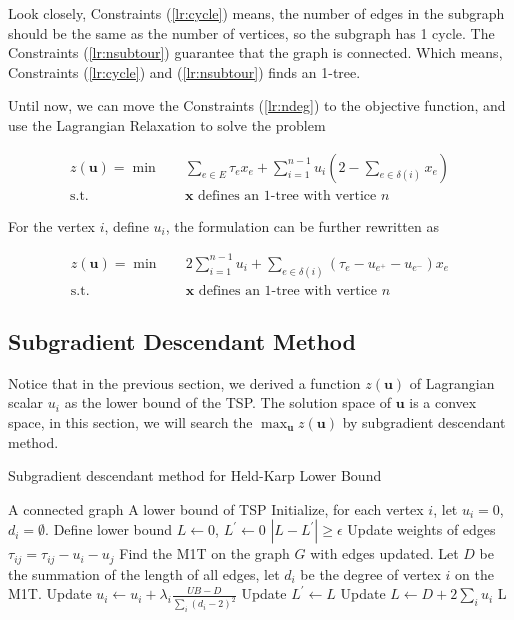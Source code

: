             Look closely, Constraints (\ref{lr:cycle}) means, the number of edges in the subgraph should be the same as the number of vertices, so the subgraph has 1 cycle. The Constraints (\ref{lr:nsubtour}) guarantee that the graph is connected. Which means, Constraints (\ref{lr:cycle}) and (\ref{lr:nsubtour}) finds an 1-tree.

            Until now, we can move the Constraints (\ref{lr:ndeg}) to the objective function, and use the Lagrangian Relaxation to solve the problem

            \begin{align}
                z(\mathbf{u}) = \min \quad & \sum_{e \in E} \tau_e x_e + \sum_{i = 1}^{n - 1}u_i(2 - \sum_{e \in \delta(i)} x_e)\\
                \text{s.t.} \quad & \mathbf{x} \text{ defines an 1-tree with vertice } n
            \end{align}

            For the vertex $i$, define $u_i$, the formulation can be further rewritten as

            \begin{align}
                z(\mathbf{u}) = \min \quad & 2\sum_{i = 1}^{n - 1} u_i + \sum_{e \in \delta(i)} (\tau_e - u_{e^+} - u_{e^-})x_e\\
                \text{s.t.} \quad & \mathbf{x} \text{ defines an 1-tree with vertice } n
            \end{align}

        \subsection{Subgradient Descendant Method}
            Notice that in the previous section, we derived a function $z(\mathbf{u})$ of Lagrangian scalar $u_i$ as the lower bound of the TSP. The solution space of $\mathbf{u}$ is a convex space, in this section, we will search the $\max_{\mathbf{u}} z(\mathbf{u})$ by subgradient descendant method.

            \begin{algorithm}
                \caption{Subgradient descendant method for Held-Karp Lower Bound}
                \begin{algorithmic}
                    \Require A connected graph
                    \Ensure A lower bound of TSP
                    \State Initialize, for each vertex $i$, let $u_i = 0$, $d_i = \emptyset$. Define lower bound $L \gets 0$, $L^\prime \gets 0$
                    \While $|L - L^\prime| \ge \epsilon$
                        \State Update weights of edges $\tau_{ij} = \tau_{ij} - u_i - u_j$
                        \State Find the M1T on the graph $G$ with edges updated. Let $D$ be the summation of the length of all edges, let $d_i$ be the degree of vertex $i$ on the M1T.
                        \State Update $u_i \gets u_i + \lambda_i \frac{UB - D}{\sum_i (d_i - 2)^2}$
                        \State Update $L^\prime \gets L$
                        \State Update $L \gets D + 2 \sum_i u_i$
                    \EndWhile
                    \State \Return L
                \end{algorithmic}
            \end{algorithm}

